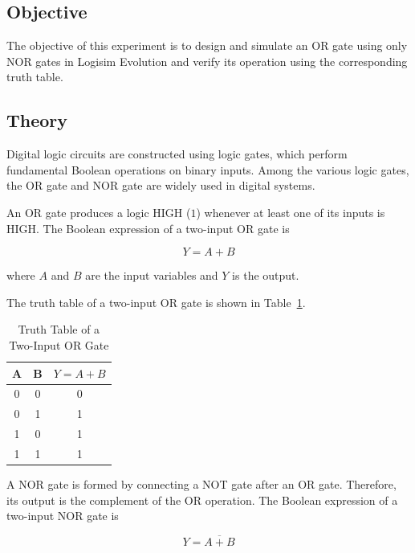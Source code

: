 \documentclass[12pt,a4paper]{article}
\begin{document}
\subsection{Objective}

The objective of this experiment is to design and simulate an OR gate using only NOR gates in Logisim Evolution and verify its operation using the corresponding truth table.


\subsection{Theory}

Digital logic circuits are constructed using logic gates, which perform fundamental Boolean operations on binary inputs. Among the various logic gates, the OR gate and NOR gate are widely used in digital systems.

An OR gate produces a logic HIGH ($1$) whenever at least one of its inputs is HIGH. The Boolean expression of a two-input OR gate is

\begin{equation}
Y = A + B
\end{equation}

where $A$ and $B$ are the input variables and $Y$ is the output.

The truth table of a two-input OR gate is shown in Table~\ref{tab:or_truth}.

\begin{table}[H]
\centering
\caption{Truth Table of a Two-Input OR Gate}
\label{tab:or_truth}
\begin{tabular}{|c|c|c|}
\hline
A & B & $Y=A+B$\\
\hline
0 & 0 & 0\\
0 & 1 & 1\\
1 & 0 & 1\\
1 & 1 & 1\\
\hline
\end{tabular}
\end{table}

A NOR gate is formed by connecting a NOT gate after an OR gate. Therefore, its output is the complement of the OR operation. The Boolean expression of a two-input NOR gate is

\begin{equation}
Y=\overline{A+B}
\end{equation}
\end{document}
